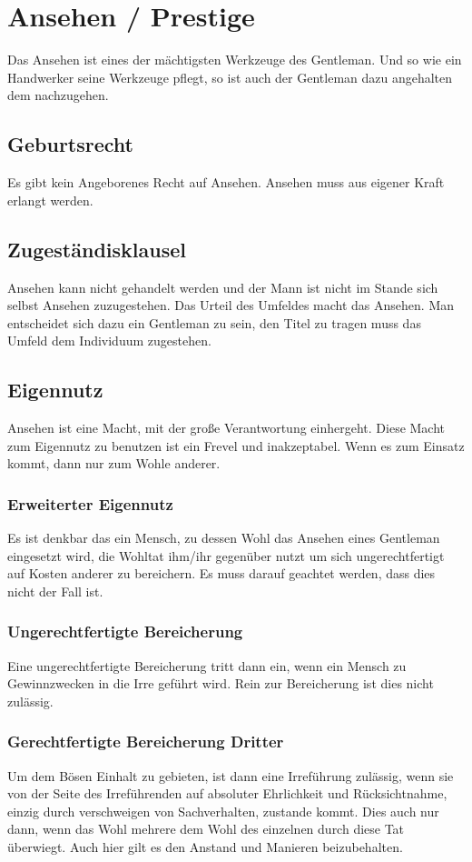 \chapter{Ansehen / Prestige}
Das Ansehen ist eines der mächtigsten Werkzeuge des Gentleman. Und so wie ein Handwerker seine Werkzeuge pflegt, so ist auch der Gentleman dazu angehalten dem nachzugehen. 

\section{Geburtsrecht}
Es gibt kein Angeborenes Recht auf Ansehen. Ansehen muss aus eigener Kraft erlangt werden.

\section{Zugeständisklausel}
Ansehen kann nicht gehandelt werden und der Mann ist nicht im Stande sich selbst Ansehen zuzugestehen. Das Urteil des Umfeldes macht das Ansehen. Man entscheidet sich dazu ein Gentleman zu sein, den Titel zu tragen muss das Umfeld dem Individuum zugestehen.

\section{Eigennutz}
Ansehen ist eine Macht, mit der große Verantwortung einhergeht. Diese Macht zum Eigennutz zu benutzen ist ein Frevel und inakzeptabel. Wenn es zum Einsatz kommt, dann nur zum Wohle anderer.

\subsection{Erweiterter Eigennutz}
Es ist denkbar das ein Mensch, zu dessen Wohl das Ansehen eines Gentleman eingesetzt wird, die Wohltat ihm/ihr gegenüber nutzt um sich ungerechtfertigt auf Kosten anderer zu bereichern. Es muss darauf geachtet werden, dass dies nicht der Fall ist.

\subsection{Ungerechtfertigte Bereicherung} Eine ungerechtfertigte Bereicherung tritt dann ein, wenn ein Mensch zu Gewinnzwecken in die Irre geführt wird. Rein zur Bereicherung ist dies nicht zulässig.

\subsection{Gerechtfertigte Bereicherung Dritter} Um dem Bösen Einhalt zu gebieten, ist dann eine Irreführung zulässig, wenn sie von der Seite des Irreführenden auf absoluter Ehrlichkeit und Rücksichtnahme, einzig durch verschweigen von Sachverhalten, zustande kommt. Dies auch nur dann, wenn das Wohl mehrere dem Wohl des einzelnen durch diese Tat überwiegt. Auch hier gilt es den Anstand und Manieren beizubehalten.
